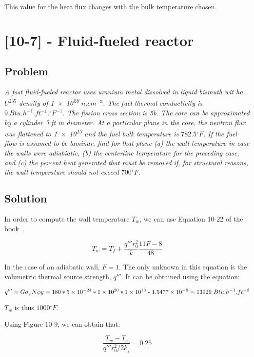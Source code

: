 This value for the heat flux changes with the bulk temperature chosen.

\section{[10-7] - Fluid-fueled reactor}
\label{prob102}


\subsection{Problem}
\textit{A fast fluid-fueled reactor uses uranium metal dissolved in liquid bismuth wit ha $U^{235}$ density of \num{1e20} $n.cm^{-3}$. The fuel thermal conductivity is $9\ Btu.h^{-1}.ft^{-1}.{}^\circ F^{-1}$. The fission cross section is 5b. The core can be approximated by a cylinder 3 ft in diameter. At a particular plane in the core, the neutron flux was flattened to \num{1e13} and the fuel bulk temperature is $782.5{}^\circ F$. If the fuel flow is assumed to be laminar, find for that plane (a) the wall temperature in case the walls were adiabiatic, (b) the centerline temperature for the preceding case, and (c) the percent heat generated that must be removed if, for structural reasons, the wall temperature should not exceed $700{}^\circ F$.}

\subsection{Solution}


In order to compute the wall temperature $T_w$, we can use Equation 10-22 of the book~\cite{book01}.

\begin{equation}\label{eq102}
T_w = T_f + \frac{q'''r_0^2}{k}\frac{11F-8}{48}
\end{equation}

In the case of an adiabatic wall, $F = 1$. The only unknown in this equation is the volumetric thermal source strength, $q'''$. It can be obtained using the equation:

\begin{equation}
q''' = G \sigma_f N \phi g = 180 * \text{\num{5e-24}} * \text{\num{1e20}} * \text{\num{1e13}} * \text{\num{1.5477e-8}} = 13929\ Btu.h^{-1}.ft^{-3}
\end{equation}

$T_w$ is thus $1000{}^\circ F$.

Using Figure 10-9, we can obtain that:

\begin{equation}
\frac{T_w - T_c}{q'''r_0^2/2k_f} = 0.25
\end{equation}

